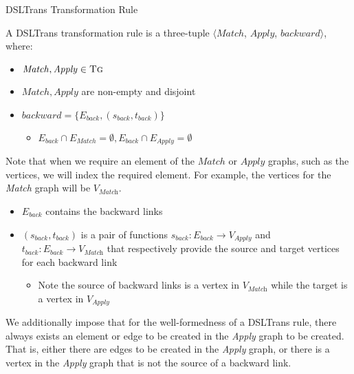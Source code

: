 \begin{definition}{DSLTrans Transformation Rule\\}
\label{def:transformation_rule}

A DSLTrans transformation rule is a three-tuple $\big\langle \mathit{Match}$, $\mathit{Apply}$, $\mathit{backward}\big\rangle$, where:

\begin{itemize}
\item $\mathit{Match}, \mathit{Apply} \in \textsc{Tg}$
\item $\mathit{Match}, \mathit{Apply} $ are non-empty and disjoint
\item $\mathit{backward} = \{E_{back}, (s_{back}, t_{back})\}$
\begin{itemize}
\item $E_{back} \cap E_{Match} = \emptyset, E_{back} \cap E_{Apply} = \emptyset$
\end{itemize}
\end{itemize}  

Note that when we require an element of the $\mathit{Match}$ or $\mathit{Apply}$ graphs, such as the vertices, we will index the required element. For example, the vertices for the \textit{Match} graph will be $V_{\textit{Match}}$.

\begin{itemize}
\item $E_{back}$ contains the backward links
\item $(s_{back}, t_{back})$ is a pair of functions $s_{back}: E_{back}\rightarrow V_{\textit{Apply}}$ and $t_{back}: E_{back}\rightarrow V_{\textit{Match}}$ that respectively provide the source and target vertices for each backward link
\begin{itemize}
\item Note the source of backward links is a vertex in $V_{\textit{Match}}$ while the target is a vertex in $V_{\textit{Apply}}$
\end{itemize}
\end{itemize}

\end{definition}

We additionally impose that for the well-formedness of a DSLTrans rule, there always exists an element or edge to be created in the \textit{Apply} graph to be created. That is, either there are edges to be created in the \textit{Apply} graph, or there is a vertex in the \textit{Apply} graph that is not the source of a backward link.

